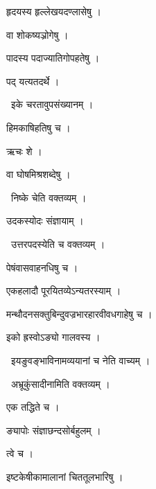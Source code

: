 \documentclass[10pt, openany, oneside]{book}
\begin{document}
\noindent हृदयस्य हृल्लेखयदण्लासेषु ।

\noindent वा शोकष्यञ्रोगेषु ।

\noindent पादस्य पदाज्यातिगोपहतेषु ।

\noindent पद् यत्यतदर्थे ।

\par\noindent\hspace{1.5em}{\vps वा॰}~{\qt इके चरतावुपसंख्यानम् ।}

\noindent हिमकाषिहतिषु च ।

\noindent ऋचः शे ।

\noindent वा घोषमिश्रशब्देषु ।

\par\noindent\hspace{1.5em}{\vps वा॰}~{\qt निष्के चेति वक्तव्यम् ।}

\noindent उदकस्योदः संज्ञायाम् ।

\par\noindent\hspace{1.5em}{\vps वा॰}~{\qt उत्तरपदस्येति च वक्तव्यम् ।}

\noindent पेषंवासवाहनधिषु च ।

\noindent एकहलादौ पूरयितव्येऽन्यतरस्याम् ।

\noindent मन्थौदनसक्तुबिन्दुवज्रभारहारवीवधगाहेषु च ।

\noindent इको ह्रस्वोऽङ्यो गालवस्य ।

\par\noindent\hspace{1.5em}{\vps वा॰}~{\qt इयङुवङ्भाविनामव्ययानां च नेति वाच्यम् ।}

\par\noindent\hspace{1.5em}{\vps वा॰}~{\qt अभ्रूकुंसादीनामिति वक्तव्यम् ।}

\noindent एक तद्धिते च ।

\noindent ङ्यापोः संज्ञाछन्दसोर्बहुलम् ।

\noindent त्वे च ।

\noindent इष्टकेषीकामालानां चिततूलभारिषु ।
\end{document}
